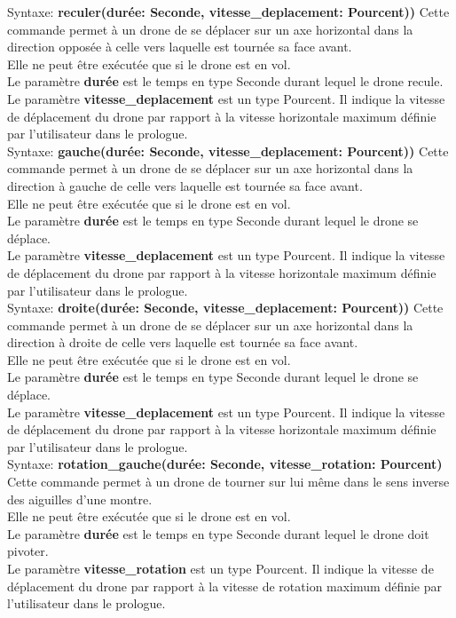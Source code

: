 \documentclass[12pt]{article}
\begin{document}
		\quad Syntaxe: \textbf{reculer(durée: Seconde, vitesse\_deplacement: Pourcent))}  \bigbreak
			Cette commande permet à un drone de se déplacer sur un axe horizontal dans la direction opposée à celle vers laquelle est tournée sa face avant. \\
			Elle ne peut être exécutée que si le drone est en vol.\\
			Le paramètre \textbf{durée} est le temps en type Seconde durant lequel le drone recule. \\
			Le paramètre \textbf{vitesse\_deplacement} est un type Pourcent. Il indique la vitesse de déplacement du drone par rapport à la vitesse horizontale maximum définie par l'utilisateur dans le prologue.  \\


		\quad Syntaxe: \textbf{gauche(durée: Seconde, vitesse\_deplacement: Pourcent))}  \bigbreak
			Cette commande permet à un drone de se déplacer sur un axe horizontal dans la direction à gauche de celle vers laquelle est tournée sa face avant.  \\
			Elle ne peut être exécutée que si le drone est en vol. \\
			Le paramètre \textbf{durée} est le temps en type Seconde durant lequel le drone se déplace. \\
			Le paramètre \textbf{vitesse\_deplacement} est un type Pourcent. Il indique la vitesse de déplacement du drone par rapport à la vitesse horizontale maximum définie par l'utilisateur dans le prologue.  \\

		\quad Syntaxe: \textbf{droite(durée: Seconde, vitesse\_deplacement: Pourcent))}  \bigbreak
			Cette commande permet à un drone de se déplacer sur un axe horizontal dans la direction à droite de celle vers laquelle est tournée sa face avant. \\
			Elle ne peut être exécutée que si le drone est en vol.\\
			Le paramètre \textbf{durée} est le temps en type Seconde durant lequel le drone se déplace. \\
			Le paramètre \textbf{vitesse\_deplacement} est un type Pourcent. Il indique la vitesse de déplacement du drone par rapport à la vitesse horizontale maximum définie par l'utilisateur dans le prologue.  \\

		\quad Syntaxe: \textbf{rotation\_gauche(durée: Seconde, vitesse\_rotation: Pourcent)}  \bigbreak
			Cette commande permet à un drone de tourner sur lui même dans le sens inverse des aiguilles d'une montre. \\
			Elle ne peut être exécutée que si le drone est en vol.\\
			Le paramètre \textbf{durée} est le temps en type Seconde durant lequel le drone doit pivoter.\\
			Le paramètre \textbf{vitesse\_rotation} est un type Pourcent. Il indique la vitesse de déplacement du drone par rapport à la vitesse de rotation maximum définie par l'utilisateur dans le prologue.  \\
\end{document}
